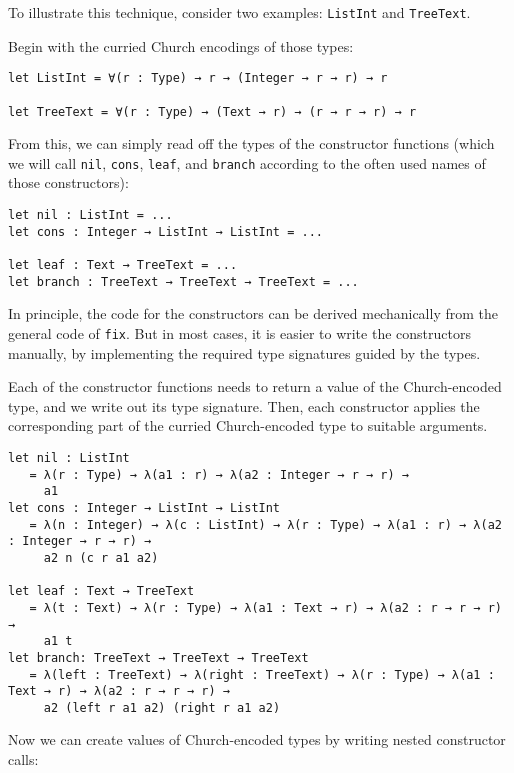To illustrate this technique, consider two examples: \lstinline!ListInt! and \lstinline!TreeText!.


Begin with the curried Church encodings of those types:


\begin{lstlisting}[language=Dhall]
let ListInt = ∀(r : Type) → r → (Integer → r → r) → r

let TreeText = ∀(r : Type) → (Text → r) → (r → r → r) → r
\end{lstlisting}


From this, we can simply read off the types of the constructor functions (which we will call \lstinline!nil!, \lstinline!cons!, \lstinline!leaf!, and \lstinline!branch! according to the often used names of those constructors):


\begin{lstlisting}[language=Dhall]
let nil : ListInt = ...
let cons : Integer → ListInt → ListInt = ...

let leaf : Text → TreeText = ...
let branch : TreeText → TreeText → TreeText = ...
\end{lstlisting}


In principle, the code for the constructors can be derived mechanically from the general code of \lstinline!fix!.
But in most cases, it is easier to write the constructors manually, by implementing the required type signatures guided by the types.


Each of the constructor functions needs to return a value of the Church-encoded type, and we write out its type signature.
Then, each constructor applies the corresponding part of the curried Church-encoded type to suitable arguments.


\begin{lstlisting}[language=Dhall]
let nil : ListInt
   = λ(r : Type) → λ(a1 : r) → λ(a2 : Integer → r → r) →
     a1
let cons : Integer → ListInt → ListInt
   = λ(n : Integer) → λ(c : ListInt) → λ(r : Type) → λ(a1 : r) → λ(a2 : Integer → r → r) →
     a2 n (c r a1 a2)

let leaf : Text → TreeText
   = λ(t : Text) → λ(r : Type) → λ(a1 : Text → r) → λ(a2 : r → r → r) →
     a1 t
let branch: TreeText → TreeText → TreeText
   = λ(left : TreeText) → λ(right : TreeText) → λ(r : Type) → λ(a1 : Text → r) → λ(a2 : r → r → r) →
     a2 (left r a1 a2) (right r a1 a2)
\end{lstlisting}


Now we can create values of Church-encoded types by writing nested constructor calls:


